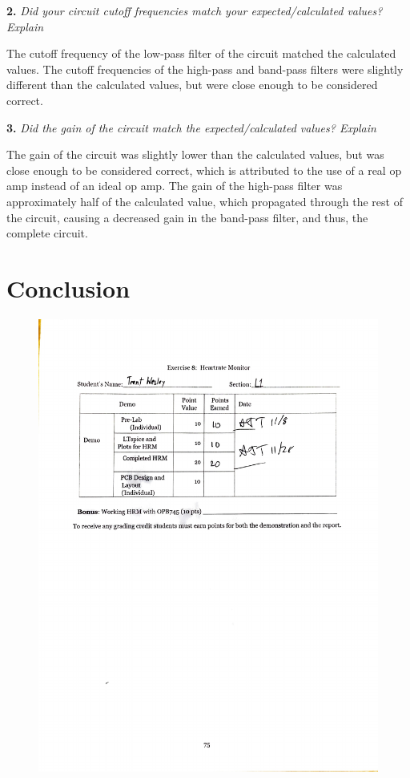 \documentclass[CMPE]{KGCOEReport}
\begin{document}
\textbf{2.} \emph{Did your circuit cutoff frequencies match your expected/calculated values? Explain}

The cutoff frequency of the low-pass filter of the circuit matched the calculated values. The cutoff frequencies of the high-pass and band-pass filters were slightly different than the calculated values, but were close enough to be considered correct.

\bigskip

\textbf{3.} \emph{Did the gain of the circuit match the expected/calculated values? Explain}

The gain of the circuit was slightly lower than the calculated values, but was close enough to be considered correct, which is attributed to the use of a real op amp instead of an ideal op amp. The gain of the high-pass filter was approximately half of the calculated value, which propagated through the rest of the circuit, causing a decreased gain in the band-pass filter, and thus, the complete circuit.

\section*{Conclusion}

\newpage
\begin{figure}[H]
    \centering
    \begin{adjustbox}{center}
        \includegraphics[width=1.26\textwidth]{signoff_1.pdf}
    \end{adjustbox}
\end{figure}
\end{document}

